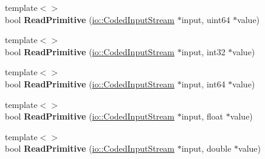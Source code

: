 \begin{DoxyCompactItemize}
\item 
\mbox{\label{classgoogle_1_1protobuf_1_1internal_1_1WireFormatLite_ab8efde617fc6177d352310904dc63fc5}} 
{\footnotesize template$<$$>$ }\\bool {\bfseries Read\+Primitive} (\hyperlink{classgoogle_1_1protobuf_1_1io_1_1CodedInputStream}{io\+::\+Coded\+Input\+Stream} $\ast$input, uint64 $\ast$value)
\item 
\mbox{\label{classgoogle_1_1protobuf_1_1internal_1_1WireFormatLite_ad937cb6f432cd24810e1c9446b2fd328}} 
{\footnotesize template$<$$>$ }\\bool {\bfseries Read\+Primitive} (\hyperlink{classgoogle_1_1protobuf_1_1io_1_1CodedInputStream}{io\+::\+Coded\+Input\+Stream} $\ast$input, int32 $\ast$value)
\item 
\mbox{\label{classgoogle_1_1protobuf_1_1internal_1_1WireFormatLite_a2b403f70285933949254f6150098e4e4}} 
{\footnotesize template$<$$>$ }\\bool {\bfseries Read\+Primitive} (\hyperlink{classgoogle_1_1protobuf_1_1io_1_1CodedInputStream}{io\+::\+Coded\+Input\+Stream} $\ast$input, int64 $\ast$value)
\item 
\mbox{\label{classgoogle_1_1protobuf_1_1internal_1_1WireFormatLite_a681f8302ab3e654582c418cfc6c9c28f}} 
{\footnotesize template$<$$>$ }\\bool {\bfseries Read\+Primitive} (\hyperlink{classgoogle_1_1protobuf_1_1io_1_1CodedInputStream}{io\+::\+Coded\+Input\+Stream} $\ast$input, float $\ast$value)
\item 
\mbox{\label{classgoogle_1_1protobuf_1_1internal_1_1WireFormatLite_ac18fc570064595064843c32994026ef0}} 
{\footnotesize template$<$$>$ }\\bool {\bfseries Read\+Primitive} (\hyperlink{classgoogle_1_1protobuf_1_1io_1_1CodedInputStream}{io\+::\+Coded\+Input\+Stream} $\ast$input, double $\ast$value)
\item 
\mbox{\label{classgoogle_1_1protobuf_1_1internal_1_1WireFormatLite_a40910fb8c552c9a2b6302a8b2e30ae71}} 

\end{DoxyCompactItemize}
